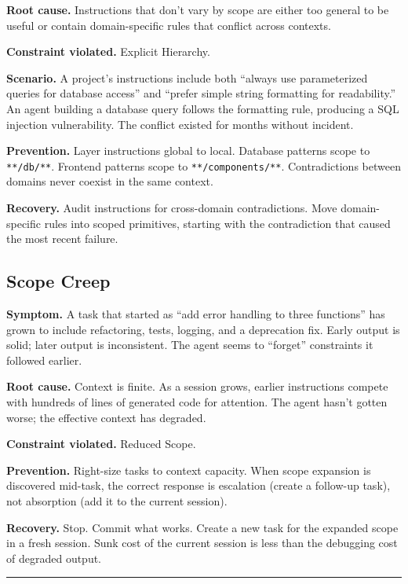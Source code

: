 \documentclass[
  a4paper,
  DIV=11,
  numbers=noendperiod]{scrreprt}
\begin{document}
\textbf{Root cause.} Instructions that don't vary by scope are either
too general to be useful or contain domain-specific rules that conflict
across contexts.

\textbf{Constraint violated.} Explicit Hierarchy.

\textbf{Scenario.} A project's instructions include both ``always use
parameterized queries for database access'' and ``prefer simple string
formatting for readability.'' An agent building a database query follows
the formatting rule, producing a SQL injection vulnerability. The
conflict existed for months without incident.

\textbf{Prevention.} Layer instructions global to local. Database
patterns scope to \texttt{**/db/**}. Frontend patterns scope to
\texttt{**/components/**}. Contradictions between domains never coexist
in the same context.

\textbf{Recovery.} Audit instructions for cross-domain contradictions.
Move domain-specific rules into scoped primitives, starting with the
contradiction that caused the most recent failure.

\subsection{Scope Creep}\label{scope-creep}

\textbf{Symptom.} A task that started as ``add error handling to three
functions'' has grown to include refactoring, tests, logging, and a
deprecation fix. Early output is solid; later output is inconsistent.
The agent seems to ``forget'' constraints it followed earlier.

\textbf{Root cause.} Context is finite. As a session grows, earlier
instructions compete with hundreds of lines of generated code for
attention. The agent hasn't gotten worse; the effective context has
degraded.

\textbf{Constraint violated.} Reduced Scope.

\textbf{Prevention.} Right-size tasks to context capacity. When scope
expansion is discovered mid-task, the correct response is escalation
(create a follow-up task), not absorption (add it to the current
session).

\textbf{Recovery.} Stop. Commit what works. Create a new task for the
expanded scope in a fresh session. Sunk cost of the current session is
less than the debugging cost of degraded output.

\begin{center}\rule{0.5\linewidth}{0.5pt}\end{center}
\end{document}
